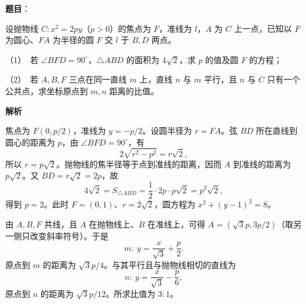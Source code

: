 \begin{answer}

\textbf{题目}：

设抛物线 $C:x^2=2py$（$p>0$）的焦点为 $F$，准线为 $l$，$A$ 为 $C$ 上一点，已知以 $F$ 为圆心、$FA$ 为半径的圆 $F$ 交 $l$ 于 $B,D$ 两点。

（1）　若 $\angle BFD=90^\circ$，$\triangle ABD$ 的面积为 $4\sqrt2$，求 $p$ 的值及圆 $F$ 的方程；

（2）　若 $A,B,F$ 三点在同一直线 $m$ 上，直线 $n$ 与 $m$ 平行，且 $n$ 与 $C$ 只有一个公共点，求坐标原点到 $m,n$ 距离的比值。

\textbf{解析}


焦点为 $F(0,p/2)$，准线为 $y=-p/2$。设圆半径为 $r=FA$。弦 $BD$ 所在直线到圆心的距离为 $p$，由 $\angle BFD=90^\circ$，有
\nopagebreak[4]
\[
2\sqrt{r^2-p^2}=r\sqrt2,
\]
所以 $r=p\sqrt2$。抛物线的焦半径等于点到准线的距离，因而 $A$ 到准线的距离为 $p\sqrt2$。又 $BD=r\sqrt2=2p$，故
\nopagebreak[4]
\[
4\sqrt2=S_{\triangle ABD}=\frac12\cdot2p\cdot p\sqrt2=p^2\sqrt2,
\]
得到 $p=2$。此时 $F=(0,1)$、$r=2\sqrt2$，圆方程为 $x^2+(y-1)^2=8$。


由 $A,B,F$ 共线，且 $A$ 在抛物线上、$B$ 在准线上，可得 $A=(\sqrt3p,3p/2)$（取另一侧只改变斜率符号）。于是
\nopagebreak[4]
\[
m:\ y=\frac{x}{\sqrt3}+\frac p2.
\]
原点到 $m$ 的距离为 $\sqrt3p/4$。与其平行且与抛物线相切的直线为
\nopagebreak[4]
\[
n:\ y=\frac{x}{\sqrt3}-\frac p6,
\]
原点到 $n$ 的距离为 $\sqrt3p/12$。所求比值为 $3:1$。



\end{answer}
